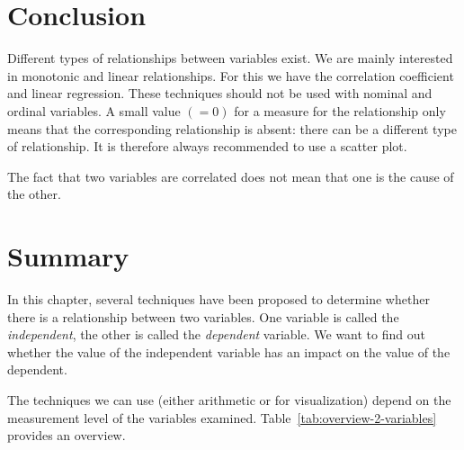\section{Conclusion}

Different types of relationships between variables exist. We are mainly interested in monotonic and linear relationships. For this we have the correlation coefficient and linear regression. These techniques should not be used with nominal and ordinal variables. A small value $(=0)$ for a measure for the relationship only means that the corresponding relationship is absent: there can be a different type of relationship. It is therefore always recommended to use a scatter plot.

The fact that two variables are correlated does not mean that one is the cause of the other.

\section{Summary}

In this chapter, several techniques have been proposed to determine whether there is a relationship between two variables. One variable is called the \emph{independent}, the other is called the \emph{dependent} variable. We want to find out whether the value of the independent variable has an impact on the value of the dependent.

The techniques we can use (either arithmetic or for visualization) depend on the measurement level of the variables examined. Table~\ref{tab:overview-2-variables} provides an overview.

